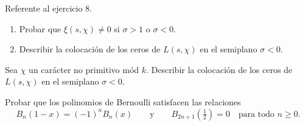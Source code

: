 \documentclass[12pt,a4paper]{book}
\begin{document}
    \begin{ejercicio}
        Referente al ejercicio 8.
        \begin{enumerate}
            \item[(a)] Probar que $\xi(s,\chi)\neq0$ si $\sigma>1$ o $\sigma<0$.
            \item[(b)] Describir la colocación de los ceros de $L(s,\chi)$ en el semiplano
            $\sigma<0$.
        \end{enumerate}
    \end{ejercicio}

    \begin{ejercicio}
        Sea $\chi$ un carácter no primitivo mód $k$. Describir la colocación de los ceros de
        $L(s,\chi)$ en el semiplano $\sigma<0$.
    \end{ejercicio}

    \begin{ejercicio}
        Probar que los polinomios de Bernoulli satisfacen las relaciones
        \begin{equation*}
            B_{n}(1-x)=(-1)^{n}B_{n}(x)\qquad\text{y}\qquad B_{2n+1}\left(\tfrac{1}{2}\right)=0\quad\text{para todo }n\geq0.
        \end{equation*}
    \end{ejercicio}
\end{document}
